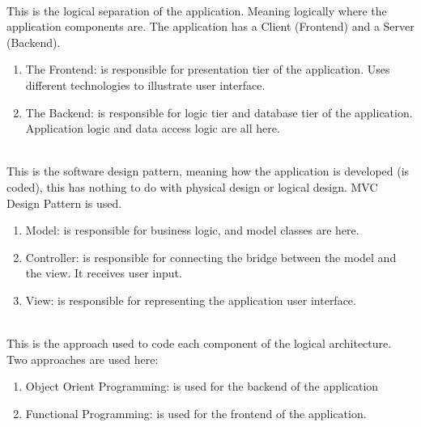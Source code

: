 \begin{justify}
\\
This is the logical separation of the application. Meaning logically where the application components are. The application has a Client (Frontend) and a Server (Backend).
\begin{enumerate}[itemsep=-0.3cm]
    \item The Frontend: is responsible for presentation tier of the application. Uses different technologies to illustrate user interface.
    \item The Backend: is responsible for logic tier and database tier of the application. Application logic and data access logic are all here.
\end{enumerate}

\vspace{0.25cm}
\\
This is the software design pattern, meaning how the application is developed (is coded), this has nothing to do with physical design or logical design. MVC Design Pattern is used.
\begin{enumerate}[itemsep=-0.3cm]
    \item Model: is responsible for business logic, and model classes are here.
    \item Controller: is responsible for connecting the bridge between the model and the view. It receives user input.
    \item View: is responsible for representing the application user interface.
\end{enumerate}

\vspace{0.25cm}
\\
This is the approach used to code each component of the logical architecture. Two approaches are used here:
\begin{enumerate}[itemsep=-0.3cm]
    \item Object Orient Programming: is used for the backend of the application
    \item Functional Programming: is used for the frontend of the application.
\end{enumerate}


\end{justify}
